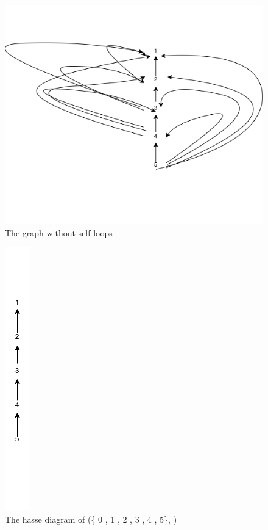\documentclass[a4 paper]{article}
\numberwithin{equation}{section}
\newcommand{\0}{\mathbf{0}}
\begin{document}
\begin{figure}[htp]
	\centering
	\includegraphics[scale=0.5]{a.png}
	\caption{The graph without self-loops}
	\label{fig: diagram}
	
\end{figure}

\begin{figure}[htp]
	\centering
	\includegraphics[scale=0.5]{b.png}
	\caption{The hasse diagram of (\{ 0 , 1 , 2 , 3 , 4 , 5\}, \leq)}
	\label{fig: diagram}
	
\end{figure}
\end{document}
